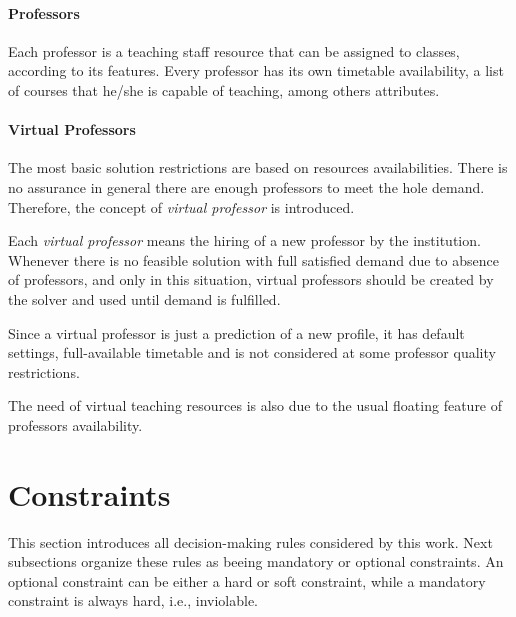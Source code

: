 \paragraph{Professors}
\label{defprof}

Each professor is a teaching staff resource that can be assigned to classes, according to its features. Every professor has its own timetable availability, a list of courses that he/she is capable of teaching, among others attributes.



\paragraph{Virtual Professors}
\label{defpv}

The most basic solution restrictions are based on resources availabilities. There is no assurance in general there are enough professors to meet the hole demand. Therefore, the concept of \textit{virtual professor} is introduced.

Each \textit{virtual professor} means the hiring of a new professor by the institution. Whenever there is no feasible solution with full satisfied demand due to absence of professors, and only in this situation, virtual professors should be created by the solver and used until demand is fulfilled.

Since a virtual professor is just a prediction of a new profile, it has default settings, full-available timetable and is not considered at some professor quality restrictions.

The need of virtual teaching resources is also due to the usual floating feature of professors availability.



\pagebreak

\section{Constraints}
\label{sec:allconstr}

This section introduces all decision-making rules considered by this work. Next subsections organize these rules as beeing mandatory or optional constraints. An optional constraint can be either a hard or soft constraint, while a mandatory constraint is always hard, i.e., inviolable.


